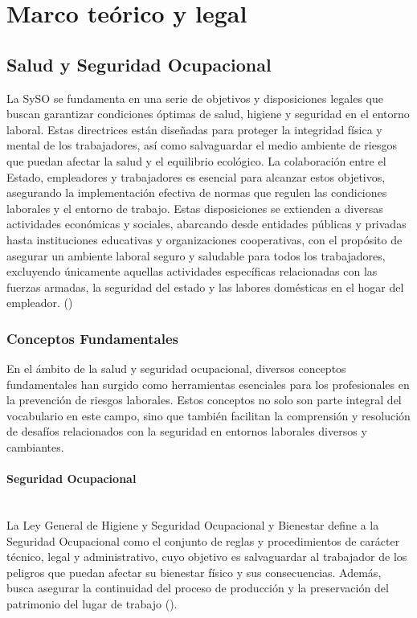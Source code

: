 \chapter{Marco teórico y legal}
\label{sec:teoria}



\section{Salud y Seguridad Ocupacional}
La SySO se fundamenta en una serie de objetivos y disposiciones legales que buscan garantizar condiciones óptimas de salud, higiene y seguridad en el entorno laboral. Estas directrices están diseñadas para proteger la integridad física y mental de los trabajadores, así como salvaguardar el medio ambiente de riesgos que puedan afectar la salud y el equilibrio ecológico. La colaboración entre el Estado, empleadores y trabajadores es esencial para alcanzar estos objetivos, asegurando la implementación efectiva de normas que regulen las condiciones laborales y el entorno de trabajo. Estas disposiciones se extienden a diversas actividades económicas y sociales, abarcando desde entidades públicas y privadas hasta instituciones educativas y organizaciones cooperativas, con el propósito de asegurar un ambiente laboral seguro y saludable para todos los trabajadores, excluyendo únicamente aquellas actividades específicas relacionadas con las fuerzas armadas, la seguridad del estado y las labores domésticas en el hogar del empleador. (\cite{Bolivia1979})

\subsection{Conceptos Fundamentales}
\indent
En el ámbito de la salud y seguridad ocupacional, diversos conceptos fundamentales han surgido como herramientas esenciales para los profesionales en la prevención de riesgos laborales. Estos conceptos no solo son parte integral del vocabulario en este campo, sino que también facilitan la comprensión y resolución de desafíos relacionados con la seguridad en entornos laborales diversos y cambiantes.

\subsubsection{Seguridad Ocupacional}\hfill\\
\indent
La Ley General de Higiene y Seguridad Ocupacional y Bienestar define a la Seguridad Ocupacional como el conjunto de reglas y procedimientos de carácter técnico, legal y administrativo, cuyo objetivo es salvaguardar al trabajador de los peligros que puedan afectar su bienestar físico y sus consecuencias. Además, busca asegurar la continuidad del proceso de producción y la preservación del patrimonio del lugar de trabajo (\cite{Bolivia1979}).

